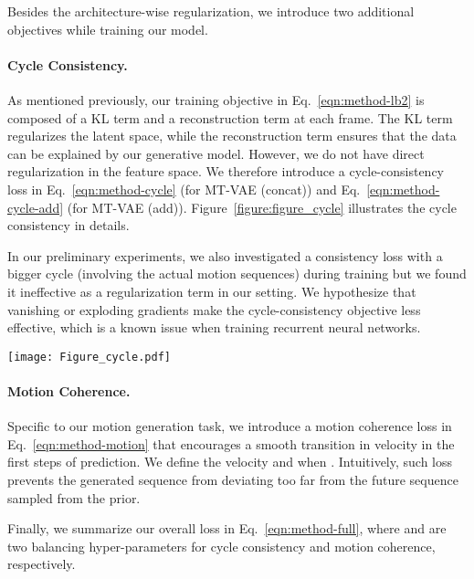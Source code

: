 \documentclass[runningheads]{llncs}
\begin{document}
Besides the architecture-wise regularization, we introduce two additional objectives while training our model.
\vspace*{-0.1in}
\paragraph{Cycle Consistency.} 
As mentioned previously, our training objective  in Eq.~\ref{eqn:method-lb2} is composed of a KL term and a reconstruction term at each frame.
The KL term regularizes the latent space, while the reconstruction term ensures that the data can be explained by our generative model.
However, we do not have direct regularization in the feature space.
We therefore introduce a cycle-consistency loss in Eq.~\ref{eqn:method-cycle} (for MT-VAE (concat)) and Eq.~\ref{eqn:method-cycle-add} (for MT-VAE (add)).
Figure~\ref{figure:figure_cycle} illustrates the cycle consistency in details.

In our preliminary experiments, we also investigated a consistency loss with a bigger cycle (involving the actual motion sequences) during training but we found it ineffective as a regularization term in our setting.
We hypothesize that vanishing or exploding gradients make the cycle-consistency objective less effective, which is a known issue when training recurrent neural networks.


\begin{figure*}[t]
\centering
\texttt{[image: Figure\_cycle.pdf]}
\caption{Illustrations of cycle consistency in MT-VAE variations. }
\label{figure:figure_cycle}
\vspace*{-0.2in}
\end{figure*}

\vspace*{-0.1in}
\paragraph{Motion Coherence.}


Specific to our motion generation task, we introduce a motion coherence loss in Eq.~\ref{eqn:method-motion} that encourages a smooth transition in velocity in the first  steps of prediction. 
We define the velocity  and  when .
Intuitively, such loss prevents the generated sequence from deviating too far from the future sequence sampled from the prior.
\vspace*{-0.1in}


Finally, we summarize our overall loss in Eq.~\ref{eqn:method-full}, where  and  are two balancing hyper-parameters for cycle consistency and motion coherence, respectively.
\end{document}
